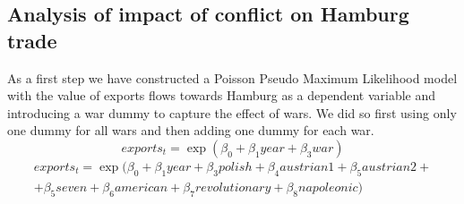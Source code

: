 \documentclass[12pt,a4paper,titlepage,english]{article}
\begin{document}
\subsection{Analysis of impact of conflict on Hamburg trade}
As a first step we have constructed a Poisson Pseudo Maximum Likelihood model with the value of exports flows towards Hamburg as a dependent variable and introducing a war dummy to capture the effect of wars. We did so first using only one dummy for all wars and then adding one dummy for each war. 
\begin{equation}
exports_t=\exp(\beta_0+\beta_1year+\beta_3war)
\end{equation}
\begin{multline}
exports_t=\exp(\beta_0+\beta_1year+\beta_3polish +\beta_4austrian1 +\beta_5 austrian2+ \\ + \beta_5seven + \beta_6american +\beta_7revolutionary+\beta_8napoleonic)
\end{multline}
\end{document}

